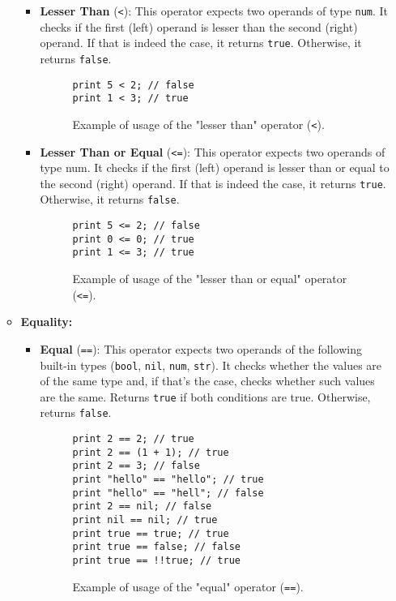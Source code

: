\begin{itemize}
\begin{itemize}
\begin{itemize}
                    \item \textbf{Lesser Than} (\texttt{<}): This operator expects two operands of type \texttt{num}. It checks if the first (left) operand is lesser than the second (right) operand. If that is indeed the case, it returns \texttt{true}. Otherwise, it returns \texttt{false}.
                    \begin{figure}[H]
                        \centering
                        \begin{lstlisting}
print 5 < 2; // false
print 1 < 3; // true
                        \end{lstlisting}
                        \caption{Example of usage of the "lesser than" operator (\texttt{<}).}
                    \end{figure}

                    
                    \item \textbf{Lesser Than or Equal} (\texttt{<=}): This operator expects two operands of type num. It checks if the first (left) operand is lesser than or equal to the second (right) operand. If that is indeed the case, it returns \texttt{true}. Otherwise, it returns \texttt{false}.
                    \begin{figure}[H]
                        \centering
                        \begin{lstlisting}
print 5 <= 2; // false
print 0 <= 0; // true
print 1 <= 3; // true
                        \end{lstlisting}
                        \caption{Example of usage of the "lesser than or equal" operator (\texttt{<=}).}
                    \end{figure}
                \end{itemize}
                
            \item \textbf{Equality:}
                \begin{itemize}
                    \item \textbf{Equal} (\texttt{==}): This operator expects two operands of the following built-in types (\texttt{bool}, \texttt{nil}, \texttt{num}, \texttt{str}). It checks whether the values are of the same type and, if that's the case, checks whether such values are the same. Returns \texttt{true} if both conditions are true. Otherwise, returns \texttt{false}.
                    \begin{figure}[H]
                        \centering
                        \begin{lstlisting}
print 2 == 2; // true
print 2 == (1 + 1); // true
print 2 == 3; // false
print "hello" == "hello"; // true
print "hello" == "hell"; // false
print 2 == nil; // false
print nil == nil; // true
print true == true; // true
print true == false; // false
print true == !!true; // true
                        \end{lstlisting}
                        \caption{Example of usage of the "equal" operator (\texttt{==}).}
                    \end{figure}


\end{itemize}
\end{itemize}
\end{itemize}
